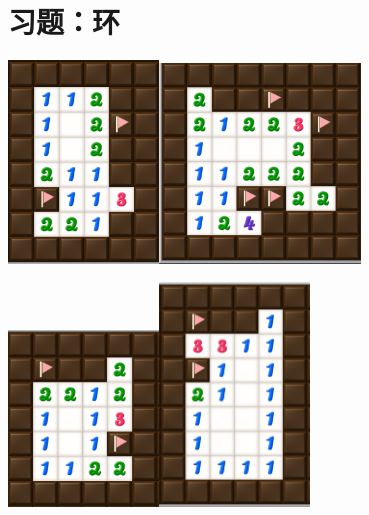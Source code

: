 \section{习题：环}
\begin{center}
    \includegraphics[width=0.3\textwidth]{exercise/环8.png}\quad\includegraphics[width=0.4\textwidth]{exercise/环9.png}
    
    \includegraphics[width=0.3\textwidth]{exercise/环10.png}\quad\includegraphics[width=0.3\textwidth]{exercise/环11.png}
\end{center}